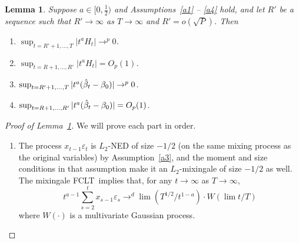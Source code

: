 \documentclass[12pt,fleqn]{article}
\newtheorem{lema}{Lemma}[section]
\theoremstyle{definition}
\newcommand{\btrue}[1][]{\if#1*\hat\beta_{T+1}\else\beta_0\fi}
\newcommand{\bh}{\hat{\beta}}
\newcommand{\ep}{\varepsilon}
\newcommand{\fclt}{FCLT}
\begin{document}
\begin{lema}\label{res:a2}
  Suppose $a \in [0,\frac12)$ and Assumptions~\ref{a1} -- \ref{a4}
  hold, and let $R'$ be a sequence such that $R' \to \infty$ as $T \to
  \infty$ and $R' = o(\sqrt{P})$. Then
  \begin{enumerate}
  \item $\sup_{t=R'+1,\dots,T} | t^a H_t | \to^p 0$.
  \item $\sup_{t=R+1,\dots,R'} | t^a H_t | = O_p(1)$.
  \item $\sup_{t = R'+1,\dots,T} | t^a(\bh_t - \btrue) | \to^{p} 0$.
  \item $\sup_{t = R+1,\dots,R'} | t^a(\bh_t - \btrue) | = O_p(1)$.
  \end{enumerate}
\end{lema}

\begin{proof}[Proof of Lemma~\ref{res:a2}]
  We will prove each part in order.
  \begin{enumerate}
  \item The process $x_{t-1} \ep_t$ is $L_2$-NED of size $-1/2$ (on
    the same mixing process as the original variables) by
    Assumption~\ref{a3}, and the moment and size conditions in that
    assumption make it an $L_2$-mixingale of size $-1/2$ as well. The
    mixingale \fclt\ implies that, for any $t \to \infty$ as $T \to \infty$,
    \begin{equation}\label{eq:2}
      t^{a - 1} \sum_{s=2}^t x_{s-1} \ep_s \to^d \lim (T^{1/2} / t^{1-a}) \cdot W(\lim t/T)
    \end{equation}
    where $W(\cdot)$ is a multivariate Gaussian process.


\end{enumerate}
\end{proof}
\end{document}
